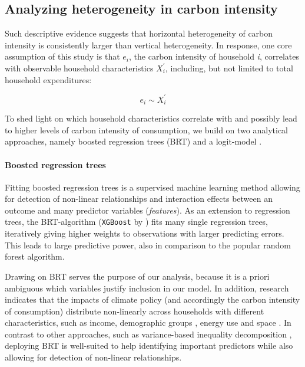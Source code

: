 \documentclass[12pt, a4paper]{article}
\begin{document}
\subsection{Analyzing heterogeneity in carbon intensity} \label{sec:methods}

Such descriptive evidence suggests that horizontal heterogeneity of carbon intensity is consistently larger than vertical heterogeneity. In response, one core assumption of this study is that $e_{i}$, the carbon intensity of household \textit{i}, correlates with observable household characteristics $X_{i}^{'}$, including, but not limited to total household expenditures:

\begin{equation} \label{eq:relationship}
    e_{i} \sim X_{i}^{'}
\end{equation}


To shed light on which household characteristics correlate with and possibly lead to higher levels of carbon intensity of consumption, we build on two analytical approaches, namely boosted regression trees (BRT) and a logit-model \autocite[e.g.][]{Bentejac.2021}.

\paragraph{Boosted regression trees} Fitting boosted regression trees \autocite{Friedman.2003, Elith.2008} is a supervised machine learning method allowing for detection of non-linear relationships and interaction effects between an outcome and many predictor variables (\textit{features}). As an extension to regression trees, the BRT-algorithm (\texttt{XGBoost} by \textcite{Chen.2016}) fits many single regression trees, iteratively giving higher weights to observations with larger predicting errors. This leads to large predictive power, also in comparison to the popular random forest algorithm.

Drawing on BRT serves the purpose of our analysis, because it is a priori ambiguous which variables justify inclusion in our model. In addition, research indicates that the impacts of climate policy (and accordingly the carbon intensity of consumption) distribute non-linearly across households with different characteristics, such as income, demographic groups \autocite{Missbach.2023}, energy use \autocite{Farrell.2017} and space \autocite{Chan.2023}. In contrast to other approaches, such as variance-based inequality decomposition \autocite{Farrell.2017,Sager.2019,Missbach.2024}, deploying BRT is well-suited to help identifying important predictors while also allowing for detection of non-linear relationships.
\end{document}
